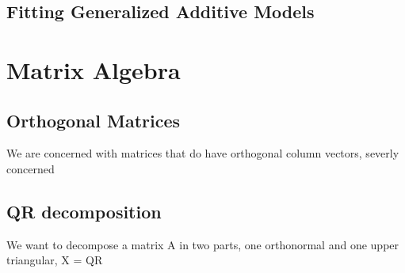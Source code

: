 \documentclass{article}
\begin{document}
    \subsection{Fitting Generalized Additive Models}

    \section{Matrix Algebra}
    \subsection{Orthogonal Matrices}
    We are concerned with matrices that do have orthogonal column vectors, severly concerned
    \subsection{QR decomposition}
    We want to decompose a matrix A in two parts, one orthonormal and one upper triangular, X = QR


    \newpage


    \newpage
\end{document}
